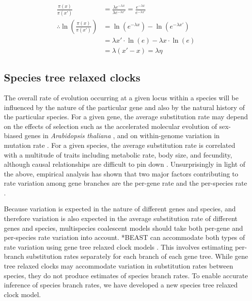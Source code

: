 \documentclass[12pt]{article}
\begin{document}
\begin{align}
\frac{\pi(x)}{\pi(x')} &= \frac{\lambda e^{-\lambda x}}{\lambda e^{-\lambda x'}} = \frac{e^{-\lambda x}}{e^{-\lambda x'}}\\
\therefore \ln\left(\frac{\pi(x)}{\pi(x')}\right) &= \ln \left(e^{-\lambda x}\right) - \ln \left(e^{-\lambda x'}\right)\\
& = \lambda x' \cdot \ln \left(e\right) - \lambda x \cdot \ln \left(e\right)\\
& = \lambda \left(x' - x\right) = \lambda \eta
\end{align}

\subsection{Species tree relaxed clocks}

The overall rate of evolution occurring at a given locus within a species will
be influenced by the nature of the particular gene and also by the natural
history of the particular species. For a given gene, the average substitution
rate may depend on the effects of selection such as the accelerated molecular
evolution of sex-biased genes in \textit{Arabidopsis thaliana}
\citep{Gossmann01032014}, and on within-genome variation in mutation rate \citep{Baer2007}.
For a given species, the average substitution rate is correlated with a
multitude of traits including metabolic rate, body size, and fecundity, although
causal relationships are difficult to pin down \citep{Bromham2503}.
Unsurprisingly in light of the above, empirical analysis has shown that two
major factors contributing to rate variation among gene branches are the
per-gene rate and the per-species rate \citep{Rasmussen01122007}.

Because variation is expected in the nature of different genes and species, and
therefore variation is also expected in the average substitution rate of different
genes and species, multispecies coalescent models should take both per-gene and
per-species rate variation into account. *BEAST can accommodate both types of
rate variation using gene tree relaxed clock models \citep[for examples see][]{Berv2014120, Lambert2015146}.
This involves estimating per-branch substitution rates separately
for each branch of each gene tree. While gene tree relaxed clocks may
accommodate variation in substitution rates between species, they do not produce
estimates of species branch rates. To enable accurate inference of species
branch rates, we have developed a new species tree relaxed clock model.
\end{document}
